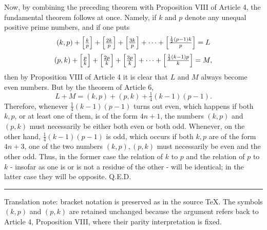 \documentclass[11pt]{article}
\begin{document}
Now, by combining the preceding theorem with Proposition VIII of Article 4, the
fundamental theorem follows at once. Namely, if $k$ and $p$ denote any unequal
positive prime numbers, and if one puts
\[
  (k,p)+\Bigl[\tfrac{k}{p}\Bigr]+\Bigl[\tfrac{2k}{p}\Bigr]+\Bigl[\tfrac{3k}{p}\Bigr]
        +\dots+\Bigl[\tfrac{\frac{1}{2}(p-1)k}{p}\Bigr]=L
\]
\[
  (p,k)+\Bigl[\tfrac{p}{k}\Bigr]+\Bigl[\tfrac{2p}{k}\Bigr]+\Bigl[\tfrac{3p}{k}\Bigr]
        +\dots+\Bigl[\tfrac{\frac{1}{2}(k-1)p}{k}\Bigr]=M,
\]
then by Proposition VIII of Article 4 it is clear that $L$ and $M$ always become
even numbers. But by the theorem of Article 6,
\[
  L+M=(k,p)+(p,k)+\tfrac{1}{4}(k-1)(p-1).
\]
Therefore, whenever $\tfrac{1}{4}(k-1)(p-1)$ turns out even, which happens if
both $k,p$, or at least one of them, is of the form $4n+1$, the numbers
$(k,p)$ and $(p,k)$ must necessarily be either both even or both odd. Whenever,
on the other hand, $\tfrac{1}{4}(k-1)(p-1)$ is odd, which occurs if both $k,p$
are of the form $4n+3$, one of the two numbers $(k,p),(p,k)$ must necessarily
be even and the other odd. Thus, in the former case the relation of $k$ to $p$
and the relation of $p$ to $k$ - insofar as one is or is not a residue of the
other - will be identical; in the latter case they will be opposite.
\textsc{Q.E.D.}

\bigskip
\hrule\medskip
\noindent\footnotesize Translation note: bracket notation is preserved as in the source
TeX. The symbols $(k,p)$ and $(p,k)$ are retained unchanged because the argument
refers back to Article 4, Proposition VIII, where their parity interpretation is fixed.
\end{document}
